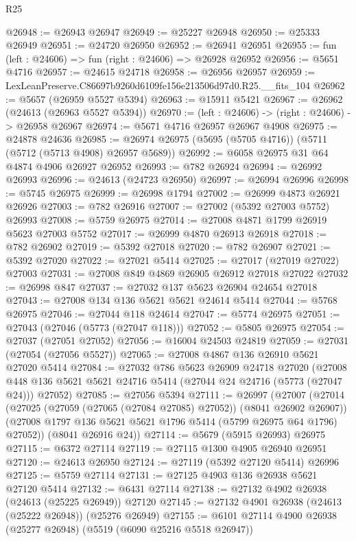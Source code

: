 \begin{lexlean}{R25}
\begin{coremodule}
@26948 := @26943 @26947
@26949 := @25227 @26948
@26950 := @25333 @26949
@26951 := @24720 @26950
@26952 := @26941 @26951
@26955 := fun (left : @24606) => fun (right : @24606) => @26928 @26952
@26956 := @5651 @4716
@26957 := @24615 @24718
@26958 := @26956 @26957
@26959 := LexLeanPreserve.C86697b9260d6109fe156e213506d97d0.R25.__fits_104
@26962 := @5657 (@26959 @5527 @5394)
@26963 := @15911 @5421
@26967 := @26962 (@24613 (@26963 @5527 @5394))
@26970 := (left : @24606) -> (right : @24606) -> @26958 @26967
@26974 := @5671 @4716 @26957 @26967 @4908
@26975 := @24878 @24636
@26985 := @26974 @26975 (@5695 (@5705 @4716)) (@5711 (@5712 (@5713 @4908) @26957 @5689))
@26992 := @6058 @26975 @31 @64 @4874 @4906 @26927 @26952
@26993 := @782 @26924
@26994 := @26992 @26993
@26996 := @24613 (@24723 @26950)
@26997 := @26994 @26996
@26998 := @5745 @26975
@26999 := @26998 @1794
@27002 := @26999 @4873 @26921 @26926
@27003 := @782 @26916
@27007 := @27002 (@5392 @27003 @5752) @26993
@27008 := @5759 @26975
@27014 := @27008 @4871 @1799 @26919 @5623 @27003 @5752
@27017 := @26999 @4870 @26913 @26918
@27018 := @782 @26902
@27019 := @5392 @27018
@27020 := @782 @26907
@27021 := @5392 @27020
@27022 := @27021 @5414
@27025 := @27017 (@27019 @27022) @27003
@27031 := @27008 @849 @4869 @26905 @26912 @27018 @27022
@27032 := @26998 @847
@27037 := @27032 @137 @5623 @26904 @24654 @27018
@27043 := @27008 @134 @136 @5621 @5621 @24614 @5414
@27044 := @5768 @26975
@27046 := @27044 @118 @24614
@27047 := @5774 @26975
@27051 := @27043 (@27046 (@5773 (@27047 @118)))
@27052 := @5805 @26975
@27054 := @27037 (@27051 @27052)
@27056 := @16004 @24503 @24819
@27059 := @27031 (@27054 (@27056 @5527))
@27065 := @27008 @4867 @136 @26910 @5621 @27020 @5414
@27084 := @27032
    @786
    @5623
    @26909
    @24718
    @27020
    (@27008 @448 @136 @5621 @5621 @24716 @5414 (@27044 @24 @24716 (@5773 (@27047 @24))) @27052)
@27085 := @27056 @5394
@27111 := @26997
    (@27007
      (@27014
        (@27025 (@27059 (@27065 (@27084 @27085) @27052)) (@8041 @26902 @26907))
        (@27008 @1797 @136 @5621 @5621 @1796 @5414 (@5799 @26975 @64 @1796) @27052))
      (@8041 @26916 @24))
@27114 := @5679 (@5915 @26993) @26975
@27115 := @6372 @27114
@27119 := @27115 @1300 @4905 @26940 @26951
@27120 := @24613 @26950
@27124 := @27119 (@5392 @27120 @5414) @26996
@27125 := @5759 @27114
@27131 := @27125 @4903 @136 @26938 @5621 @27120 @5414
@27132 := @6431 @27114
@27138 := @27132 @4902 @26938 (@24613 (@25225 @26949)) @27120
@27145 := @27132 @4901 @26938 (@24613 (@25222 @26948)) (@25276 @26949)
@27155 := @6101 @27114 @4900 @26938 (@25277 @26948) (@5519 (@6090 @25216 @5518 @26947))

\end{coremodule}
\end{lexlean}
